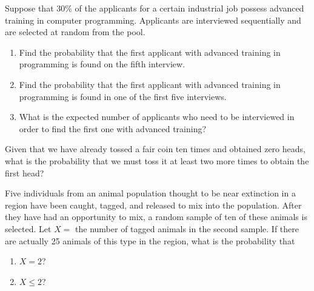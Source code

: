 \documentclass[12pt,reqno]{amsart}
\begin{document}
\newpage
\prob Suppose that 30\% of the applicants for a certain industrial job possess advanced training in computer programming. Applicants are interviewed sequentially and are selected at random from the pool.

\medskip
\begin{enumerate}
\item Find the probability that the first applicant with advanced training in programming is found on the fifth interview.\vfill



\item Find the probability that the first applicant with advanced training in programming is found in one of the first five interviews.\vfill



\item What is the expected number of applicants who need to be interviewed in order to find the first one with advanced training?\vfill


\end{enumerate}













\bigskip
\prob Given that we have already tossed a fair coin ten times and obtained zero heads, what is the probability that we must toss it at least two more times to obtain the first head?\vfill











\newpage
\prob Five individuals from an animal population thought to be near extinction in a region have been caught, tagged, and released to mix into the population. After they have had an opportunity to mix, a random sample of ten of these animals is selected. Let $X =$ the number of tagged animals in the second sample. If there are actually 25 animals of this type in the region, what is the probability that

\medskip
\begin{enumerate}
\item $X = 2$?\vfill



\item $X\leq2$?\vfill


\end{enumerate}
\end{document}

